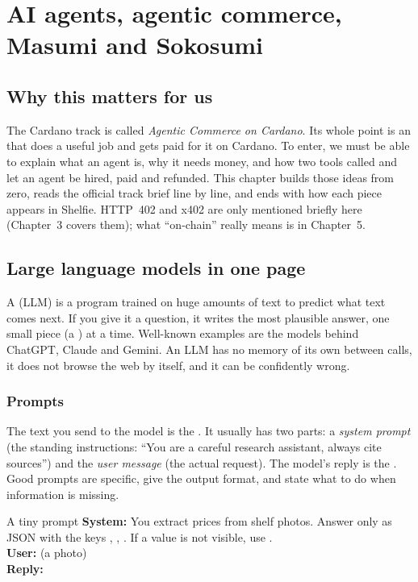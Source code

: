 \chapter{AI agents, agentic commerce, Masumi and Sokosumi}

\section*{Why this matters for us}
The Cardano track is called \emph{Agentic Commerce on Cardano}. Its whole point is an  that does a useful job and gets paid for it on Cardano. To enter, we must be able to explain what an agent is, why it needs money, and how two tools called  and  let an agent be hired, paid and refunded. This chapter builds those ideas from zero, reads the official track brief line by line, and ends with how each piece appears in Shelfie. HTTP~402 and x402 are only mentioned briefly here (Chapter~3 covers them); what ``on-chain'' really means is in Chapter~5.

\section{Large language models in one page}

A  (LLM) is a program trained on huge amounts of text to predict what text comes next. If you give it a question, it writes the most plausible answer, one small piece (a ) at a time. Well-known examples are the models behind ChatGPT, Claude and Gemini. An LLM has no memory of its own between calls, it does not browse the web by itself, and it can be confidently wrong.

\subsection{Prompts}
The text you send to the model is the . It usually has two parts: a \emph{system prompt} (the standing instructions: ``You are a careful research assistant, always cite sources'') and the \emph{user message} (the actual request). The model's reply is the . Good prompts are specific, give the output format, and state what to do when information is missing.

\begin{examplebox}{A tiny prompt}
\textbf{System:} You extract prices from shelf photos. Answer only as JSON with the keys , , . If a value is not visible, use .\\
\textbf{User:} (a photo) \\
\textbf{Reply:} 
\end{examplebox}

